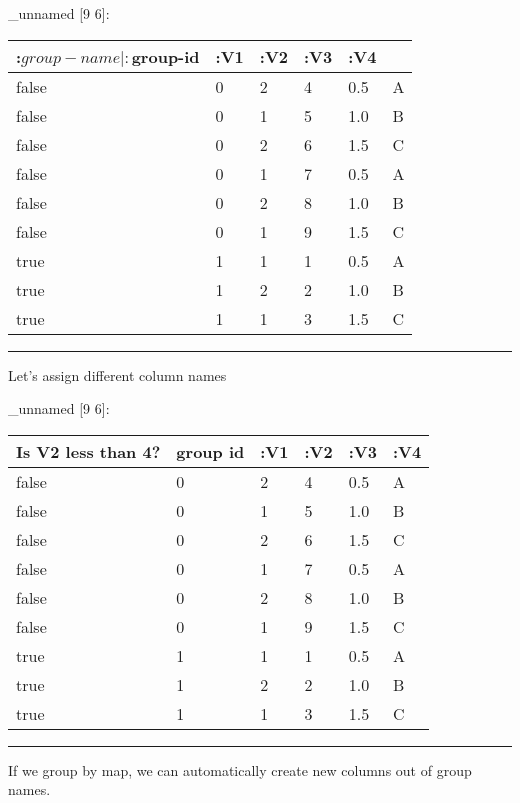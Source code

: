 \documentclass[]{article}
\newenvironment{Shaded}{\begin{snugshade}}{\end{snugshade}}
\newcommand{\AttributeTok}[1]{\textcolor[rgb]{0.77,0.63,0.00}{#1}}
\newcommand{\DecValTok}[1]{\textcolor[rgb]{0.00,0.00,0.81}{#1}}
\newcommand{\KeywordTok}[1]{\textcolor[rgb]{0.13,0.29,0.53}{\textbf{#1}}}
\newcommand{\NormalTok}[1]{#1}
\newcommand{\StringTok}[1]{\textcolor[rgb]{0.31,0.60,0.02}{#1}}
\newcommand{\VariableTok}[1]{\textcolor[rgb]{0.00,0.00,0.00}{#1}}
\begin{document}
\_unnamed {[}9 6{]}:

\begin{longtable}[]{@{}llllll@{}}
\toprule
:\(group-name | :\)group-id & :V1 & :V2 & :V3 & :V4 &\tabularnewline
\midrule
\endhead
false & 0 & 2 & 4 & 0.5 & A\tabularnewline
false & 0 & 1 & 5 & 1.0 & B\tabularnewline
false & 0 & 2 & 6 & 1.5 & C\tabularnewline
false & 0 & 1 & 7 & 0.5 & A\tabularnewline
false & 0 & 2 & 8 & 1.0 & B\tabularnewline
false & 0 & 1 & 9 & 1.5 & C\tabularnewline
true & 1 & 1 & 1 & 0.5 & A\tabularnewline
true & 1 & 2 & 2 & 1.0 & B\tabularnewline
true & 1 & 1 & 3 & 1.5 & C\tabularnewline
\bottomrule
\end{longtable}

\begin{center}\rule{0.5\linewidth}{0.5pt}\end{center}

Let's assign different column names

\begin{Shaded}
\end{Shaded}

\_unnamed {[}9 6{]}:

\begin{longtable}[]{@{}llllll@{}}
\toprule
Is V2 less than 4? & group id & :V1 & :V2 & :V3 & :V4\tabularnewline
\midrule
\endhead
false & 0 & 2 & 4 & 0.5 & A\tabularnewline
false & 0 & 1 & 5 & 1.0 & B\tabularnewline
false & 0 & 2 & 6 & 1.5 & C\tabularnewline
false & 0 & 1 & 7 & 0.5 & A\tabularnewline
false & 0 & 2 & 8 & 1.0 & B\tabularnewline
false & 0 & 1 & 9 & 1.5 & C\tabularnewline
true & 1 & 1 & 1 & 0.5 & A\tabularnewline
true & 1 & 2 & 2 & 1.0 & B\tabularnewline
true & 1 & 1 & 3 & 1.5 & C\tabularnewline
\bottomrule
\end{longtable}

\begin{center}\rule{0.5\linewidth}{0.5pt}\end{center}

If we group by map, we can automatically create new columns out of group
names.
\end{document}
